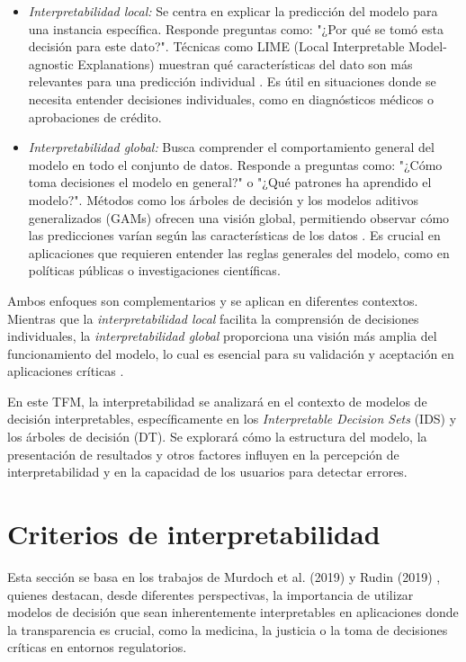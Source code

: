 \begin{itemize}
    \item \textit{Interpretabilidad local:} Se centra en explicar la predicción del modelo para una instancia específica. Responde preguntas como: "¿Por qué se tomó esta decisión para este dato?". Técnicas como LIME (Local Interpretable Model-agnostic Explanations) muestran qué características del dato son más relevantes para una predicción individual \cite{doshi2017towards, gilpin2018explaining}. Es útil en situaciones donde se necesita entender decisiones individuales, como en diagnósticos médicos o aprobaciones de crédito.

    \item \textit{Interpretabilidad global:} Busca comprender el comportamiento general del modelo en todo el conjunto de datos. Responde a preguntas como: "¿Cómo toma decisiones el modelo en general?" o "¿Qué patrones ha aprendido el modelo?". Métodos como los árboles de decisión y los modelos aditivos generalizados (GAMs) ofrecen una visión global, permitiendo observar cómo las predicciones varían según las características de los datos \cite{doshi2017towards, Kaur-2020}. Es crucial en aplicaciones que requieren entender las reglas generales del modelo, como en políticas públicas o investigaciones científicas.
\end{itemize}

Ambos enfoques son complementarios y se aplican en diferentes contextos. Mientras que la \textit{interpretabilidad local} facilita la comprensión de decisiones individuales, la \textit{interpretabilidad global} proporciona una visión más amplia del funcionamiento del modelo, lo cual es esencial para su validación y aceptación en aplicaciones críticas \cite{gilpin2018explaining, doshi2017towards, Kaur-2020}.

En este TFM, la interpretabilidad se analizará en el contexto de modelos de decisión interpretables, específicamente en los \textit{Interpretable Decision Sets} (IDS) y los árboles de decisión (DT). Se explorará cómo la estructura del modelo, la presentación de resultados y otros factores influyen en la percepción de interpretabilidad y en la capacidad de los usuarios para detectar errores.


\section{Criterios de interpretabilidad}

Esta sección se basa en los trabajos de Murdoch et al. (2019) \cite{murdoch2019interpretable} y Rudin (2019) \cite{Rudin-2019}, quienes destacan, desde diferentes perspectivas, la importancia de utilizar modelos de decisión que sean inherentemente interpretables en aplicaciones donde la transparencia es crucial, como la medicina, la justicia o la toma de decisiones críticas en entornos regulatorios. 

